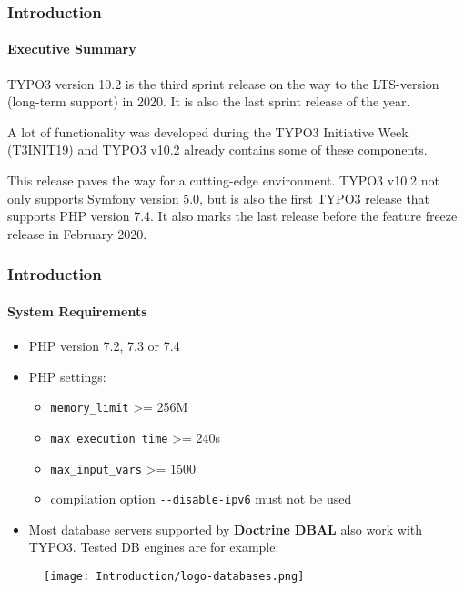 \begin{frame}[fragile]
	\frametitle{Introduction}
	\framesubtitle{Executive Summary}

	\small
		TYPO3 version 10.2 is the third sprint release on the way to the LTS-version
		(long-term support) in 2020. It is also the last sprint release of the year.

		\vspace{0.2cm}

		A lot of functionality was developed during the TYPO3 Initiative Week (T3INIT19)
		and TYPO3 v10.2 already contains some of these components.

		\vspace{0.2cm}

		This release paves the way for a cutting-edge environment. TYPO3 v10.2 not only
		supports Symfony version 5.0, but is also the first TYPO3 release that supports
		PHP version 7.4. It also marks the last release before the feature freeze release
		in February 2020.

	\normalsize

\end{frame}


\begin{frame}[fragile]
	\frametitle{Introduction}
	\framesubtitle{System Requirements}

	\begin{itemize}
		\item PHP version 7.2, 7.3 or 7.4
		\item PHP settings:

			\begin{itemize}
				\item \texttt{memory\_limit} >= 256M
				\item \texttt{max\_execution\_time} >= 240s
				\item \texttt{max\_input\_vars} >= 1500
				\item compilation option \texttt{-}\texttt{-disable-ipv6} must \underline{not} be used
			\end{itemize}

		\item Most database servers supported by \textbf{Doctrine DBAL} also work with TYPO3.
			Tested DB engines are for example:
	\end{itemize}

	\begin{figure}
		\texttt{[image: Introduction/logo-databases.png]}
	\end{figure}

\end{frame}


